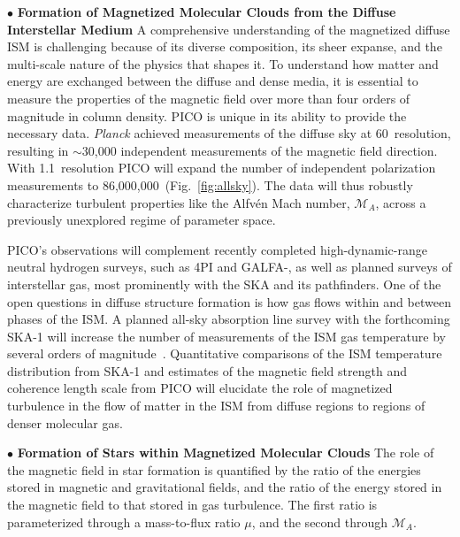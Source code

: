 \documentclass[PICOAPC.tex]{subfiles}
\begin{document}
\noindent$\bullet$ {\bf Formation of Magnetized Molecular Clouds from the Diffuse Interstellar Medium} \hspace{0.1in}
A comprehensive understanding of the magnetized diffuse \ac{ISM} is challenging because of its diverse composition, its sheer expanse, and the multi-scale nature of the physics that shapes it. To understand how matter and energy are exchanged between the diffuse and dense media, it is essential to measure the properties of the magnetic field over more than four orders of magnitude in column density. PICO is unique in its ability to provide the necessary data. \textit{Planck} achieved measurements of the diffuse sky at 60\arcmin\ resolution, resulting in $\sim$30,000 independent measurements of the magnetic field direction.  With 1.1\arcmin~resolution PICO will expand the number of independent polarization measurements to 86,000,000~(Fig.~\ref{fig:allsky}). The data will thus robustly characterize turbulent properties like the Alfv\'{e}n Mach number, $\mathcal{M}_A$, across a previously unexplored regime of parameter space. 

PICO's observations will complement recently completed high-dynamic-range neutral hydrogen surveys, such as \HI4PI \citep{HI4PI:2016} and GALFA-\hi \citep{Peek:2018}, as well as planned surveys of interstellar gas, most prominently with the SKA and its pathfinders. One of the open questions in diffuse structure formation is how gas flows within and between phases of the \ac{ISM}. A planned all-sky absorption line survey with the forthcoming SKA-1 will increase the number of measurements of the \ac{ISM} gas temperature by several orders of magnitude~\citep{McClure-Griffiths2015}. Quantitative comparisons of the \ac{ISM} temperature distribution from SKA-1 and estimates of the magnetic field strength and coherence length scale from PICO will elucidate the role of magnetized turbulence in the flow of matter in the \ac{ISM} from diffuse regions to regions of denser molecular gas.

\noindent$\bullet$ {\bf Formation of Stars within Magnetized Molecular Clouds} \hspace{0.1in}
The role of the magnetic field in star formation is quantified by the ratio of the energies stored in magnetic and gravitational fields, and the ratio of the energy stored in the magnetic field to that stored in gas turbulence. The first ratio is parameterized through a mass-to-flux ratio $\mu$, and the second through $\mathcal{M}_A$. 
\end{document}
